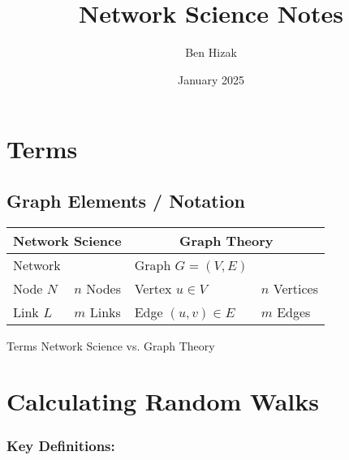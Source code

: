 \documentclass{article}
\title{Network Science Notes}
\author{Ben Hizak}
\date{January 2025}
\begin{document}
\maketitle 



\section{Terms}

\subsection{Graph Elements / Notation}

\begin{table}
\centering

\begin{tabular}{|l|l|l|l|}
\hline
\multicolumn{2}{|c|}{\textbf{Network Science}}& \multicolumn{2}{|c|}{\textbf{Graph Theory}}\\
\hline

\hline
Network  && Graph $G = (V, E)$ &\\
\hline
Node $N$ &$n$ Nodes& Vertex $u \in V$ &$n$ Vertices\\
\hline
Link $L$ &$m$ Links& Edge $(u, v) \in E$  &$m$ Edges\\
\hline

\end{tabular}

\end{table}

Terms Network Science vs. Graph Theory

\section{Calculating Random Walks}

\subsubsection{\textbf{Key Definitions}:}
\end{document}
